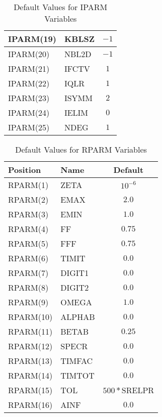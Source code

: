\begin{table}
\begin{center}
\begin{tabular}{|l|l|c|}
   IPARM(19)  &   KBLSZ  &    $-1$   \\     \hline
   IPARM(20)  &   NBL2D  &    $-1$   \\     \hline
   IPARM(21)  &   IFCTV  &     $1$   \\     \hline
   IPARM(22)  &   IQLR   &     $1$   \\     \hline
   IPARM(23)  &   ISYMM  &     $2$   \\     \hline
   IPARM(24)  &   IELIM  &     $0$   \\     \hline
   IPARM(25)  &   NDEG   &     $1$   \\     \hline
\end{tabular}
\caption{Default Values for IPARM Variables}
\end{center}
\end{table}
\begin{table}
\begin{center}
\begin{tabular}{|l|l|c|}                       \hline
   Position   &   Name   &   Default     \\    \hline
   RPARM(1)   &   ZETA   &   $10^{-6}$   \\    \hline
   RPARM(2)   &   EMAX   &    $2.0$      \\    \hline
   RPARM(3)   &   EMIN   &    $1.0$      \\    \hline
   RPARM(4)   &   FF     &    $0.75$     \\    \hline
   RPARM(5)   &   FFF    &    $0.75$     \\    \hline
   RPARM(6)   &   TIMIT  &    $0.0$      \\    \hline
   RPARM(7)   &   DIGIT1 &    $0.0$      \\    \hline
   RPARM(8)   &   DIGIT2 &    $0.0$      \\    \hline
   RPARM(9)   &   OMEGA  &    $1.0$      \\    \hline
   RPARM(10)  &   ALPHAB &    $0.0$      \\    \hline
   RPARM(11)  &   BETAB  &    $0.25$     \\    \hline
   RPARM(12)  &   SPECR  &    $0.0$      \\    \hline
   RPARM(13)  &   TIMFAC &    $0.0$      \\    \hline
   RPARM(14)  &   TIMTOT &    $0.0$      \\    \hline
   RPARM(15)  &   TOL    &  $500*\mbox{SRELPR}$  \\    \hline
   RPARM(16)  &   AINF   &    $0.0$      \\    \hline
\end{tabular}
\caption{Default Values for RPARM Variables}
\end{center}
\end{table}
 
